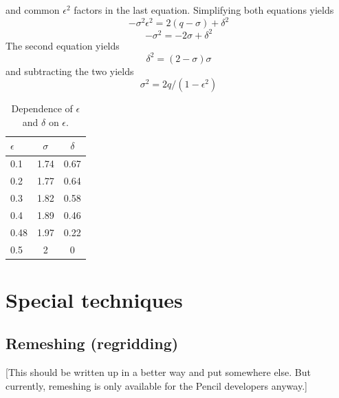 \documentclass[\mydriver,12pt,twoside,notitlepage,a4paper]{article}
\begin{document}
and common $\epsilon^2$ factors in the last equation.
Simplifying both equations yields
\begin{equation}\label{ux-eqn-insert2}
  -\sigma^2\epsilon^2 = 2(q-\sigma)+\delta^2
\end{equation}
\begin{equation}\label{uy-eqn-insert2}
  -\sigma^2 = -2\sigma+\delta^2
\end{equation}
The second equation yields
\begin{equation}\label{ux-eqn-elim1}
  \delta^2=(2-\sigma)\sigma
\end{equation}
and subtracting the two yields
\begin{equation}\label{ux-eqn-elim2}
  \sigma^2=2q/(1-\epsilon^2)
\end{equation}

\begin{table}[htb]
  \begin{center}
    \caption{
      Dependence of $\epsilon$ and $\delta$ on $\epsilon$.
    }
    \label{Tplanetsoltn}
    \begin{tabular}{lcc}
    \toprule
$\epsilon$ & $\sigma$ & $\delta$ \\
    \midrule
 0.1 & 1.74 & 0.67 \\
 0.2 & 1.77 & 0.64 \\
 0.3 & 1.82 & 0.58 \\
 0.4 & 1.89 & 0.46 \\
 0.48& 1.97 & 0.22 \\
 0.5 &  2   &  0   \\
    \bottomrule
    \end{tabular}
  \end{center}
\end{table}



\section{Special techniques}
\label{S-techinques}


\subsection{Remeshing (regridding)}
\label{S-remesh}
[This should be written up in a better way and put somewhere else.
But currently, remeshing is only available for the Pencil developers
anyway.]
\end{document}
